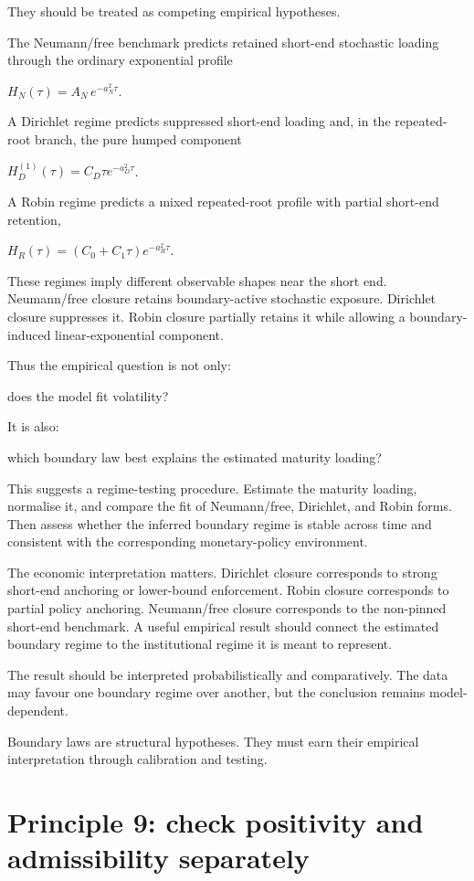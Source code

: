 \documentclass[11pt,oneside]{book}
\begin{document}
They should be treated as competing empirical hypotheses.

The Neumann/free benchmark predicts retained short-end stochastic
loading through the ordinary exponential profile

$H_N(\tau)=A_N\,e^{-a_N^2\tau}$.

A Dirichlet regime predicts suppressed short-end loading and, in the
repeated-root branch, the pure humped component

$H_D^{(1)}(\tau)=C_D\tau e^{-a_D^2\tau}$.

A Robin regime predicts a mixed repeated-root profile with partial
short-end retention,

$H_R(\tau)=(C_0+C_1\tau)e^{-a_R^2\tau}$.

These regimes imply different observable shapes near the short end.
Neumann/free closure retains boundary-active stochastic exposure.
Dirichlet closure suppresses it. Robin closure partially retains it
while allowing a boundary-induced linear-exponential component.

Thus the empirical question is not only:

does the model fit volatility?

It is also:

which boundary law best explains the estimated maturity loading?

This suggests a regime-testing procedure. Estimate the maturity loading,
normalise it, and compare the fit of Neumann/free, Dirichlet, and Robin
forms. Then assess whether the inferred boundary regime is stable across
time and consistent with the corresponding monetary-policy environment.

The economic interpretation matters. Dirichlet closure corresponds to
strong short-end anchoring or lower-bound enforcement. Robin closure
corresponds to partial policy anchoring. Neumann/free closure
corresponds to the non-pinned short-end benchmark. A useful empirical
result should connect the estimated boundary regime to the institutional
regime it is meant to represent.

The result should be interpreted probabilistically and comparatively.
The data may favour one boundary regime over another, but the conclusion
remains model-dependent.

Boundary laws are structural hypotheses. They must earn their empirical
interpretation through calibration and testing.

\section{Principle 9: check positivity and admissibility
separately}\label{principle-9-check-positivity-and-admissibility-separately}
\end{document}
